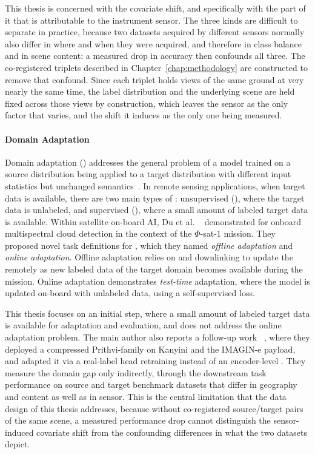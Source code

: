 This thesis is concerned with the covariate shift, and specifically with the part of it that is attributable to the instrument sensor.
The three kinds are difficult to separate in practice, because two datasets acquired by different sensors normally also differ in where and when they were acquired, and therefore in class balance and in scene content: a measured drop in accuracy then confounds all three.
The co-registered triplets described in Chapter~\ref{chap:methodology} are constructed to remove that confound.
Since each triplet holds views of the same ground at very nearly the same time, the label distribution and the underlying scene are held fixed across those views by construction, which leaves the sensor as the only factor that varies, and the shift it induces as the only one being measured.

\paragraph{Domain Adaptation}
\label{sec:domain-adaptation}

Domain adaptation () addresses the general problem of a model trained on a source distribution being applied to a target distribution with different input statistics but unchanged semantics~\cite{kouw2019introductiondomainadaptationtransfer}.
In remote sensing applications, when target data is available, there are two main types of : unsupervised (), where the target data is unlabeled, and supervised (), where a small amount of labeled target data is available.
Within satellite on-board AI, Du et al.
~\cite{du2024domainadaptation} demonstrated  for onboard multispectral cloud detection in the context of the $\Phi$-sat-1 mission.
They proposed novel task definitions for , which they named \emph{offline adaptation} and \emph{online adaptation}.
Offline adaptation relies on  and downlinking to update the  remotely as new labeled data of the target domain becomes available during the mission.
Online adaptation demonstrates \emph{test-time} adaptation, where the model is updated on-board with unlabeled data, using a self-supervised loss.

This thesis focuses on an initial  step, where a small amount of labeled target data is available for adaptation and evaluation, and does not address the online adaptation problem.
The main author also reports a follow-up work ~\cite{du2025onorbitdemonstrationgeospatialfoundation}, where they deployed a compressed Prithvi-family  on Kanyini and the IMAGIN-e payload, and adapted it via a real-label head retraining instead of an encoder-level .
They measure the domain gap only indirectly, through the downstream task performance on source and target benchmark datasets that differ in geography and content as well as in sensor.
This is the central limitation that the data design of this thesis addresses, because without co-registered source/target pairs of the same scene, a measured performance drop cannot distinguish the sensor-induced covariate shift from the confounding differences in what the two datasets depict.

